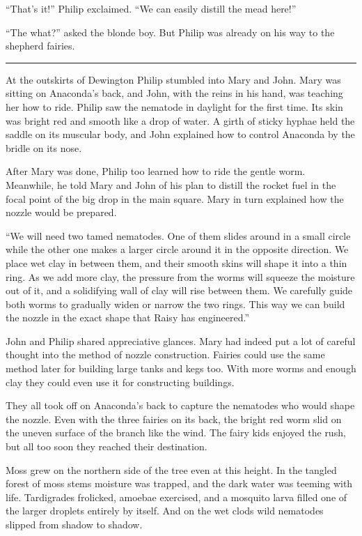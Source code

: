 \documentclass[10pt]{memoir}
\renewcommand{\pfbreakdisplay}{\bigskip \ding{166} \bigskip}
\newcommand{\secbreak}{\fancybreak{\pfbreakdisplay}}
\begin{document}
``That's it!'' Philip exclaimed. ``We can easily distill the mead here!''

``The what?'' asked the blonde boy. But Philip was already on his way to the
shepherd fairies.

\secbreak

At the outskirts of Dewington Philip stumbled into Mary and John. Mary was
sitting on Anaconda's back, and John, with the reins in his hand, was teaching
her how to ride. Philip saw the nematode in daylight for the first time. Its
skin was bright red and smooth like a drop of water. A girth of sticky hyphae
held the saddle on its muscular body, and John explained how to control
Anaconda by the bridle on its nose.

After Mary was done, Philip too learned how to ride the gentle worm. Meanwhile,
he told Mary and John of his plan to distill the rocket fuel in the focal point
of the big drop in the main square. Mary in turn explained how the nozzle would
be prepared.

``We will need two tamed nematodes. One of them slides around in a small circle
while the other one makes a larger circle around it in the opposite direction.
We place wet clay in between them, and their smooth skins will shape it into a
thin ring. As we add more clay, the pressure from the worms will squeeze the
moisture out of it, and a solidifying wall of clay will rise between them. We
carefully guide both worms to gradually widen or narrow the two rings. This way
we can build the nozzle in the exact shape that Raisy has engineered.''

John and Philip shared appreciative glances. Mary had indeed put a lot of
careful thought into the method of nozzle construction. Fairies could use the
same method later for building large tanks and kegs too. With more worms and
enough clay they could even use it for constructing buildings.

They all took off on Anaconda's back to capture the nematodes who would shape
the nozzle. Even with the three fairies on its back, the bright red worm slid
on the uneven surface of the branch like the wind. The fairy kids enjoyed the
rush, but all too soon they reached their destination.

Moss grew on the northern side of the tree even at this height. In the tangled
forest of moss stems moisture was trapped, and the dark water was teeming with
life. Tardigrades frolicked, amoebae exercised, and a mosquito larva filled one
of the larger droplets entirely by itself. And on the wet clods wild nematodes
slipped from shadow to shadow.
\end{document}
